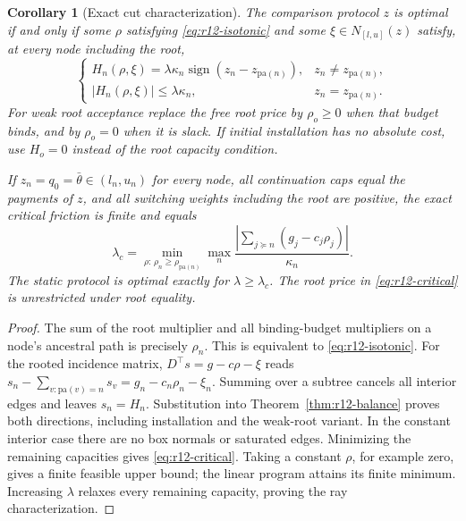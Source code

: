 \documentclass[11pt,letterpaper]{article}
\newtheorem{corollary}[theorem]{Corollary}
\theoremstyle{definition}
\newcommand{\1}{\mathbf 1}
\begin{document}
\begin{corollary}[Exact cut characterization]\label{cor:r12-cuts}
The comparison protocol $z$ is optimal if and only if some $\rho$ satisfying \eqref{eq:r12-isotonic} and some $\xi\in N_{[l,u]}(z)$ satisfy, at every node including the root,
\begin{equation}\label{eq:r12-cut-cap}
 \begin{cases}
 H_n(\rho,\xi)=\lambda\kappa_n\operatorname{sign}(z_n-z_{\mathrm{pa}(n)}),
      &z_n\ne z_{\mathrm{pa}(n)},\\
 |H_n(\rho,\xi)|\leq\lambda\kappa_n,
      &z_n=z_{\mathrm{pa}(n)}.
 \end{cases}
\end{equation}
For weak root acceptance replace the free root price by $\rho_o\geq0$ when that budget binds, and by $\rho_o=0$ when it is slack. If initial installation has no absolute cost, use $H_o=0$ instead of the root capacity condition.

If $z_n=q_0=\bar\theta\in(l_n,u_n)$ for every node, all continuation caps equal the payments of $z$, and all switching weights including the root are positive, the exact critical friction is finite and equals
\begin{equation}\label{eq:r12-critical}
 \lambda_c=\min_{\rho:\,\rho_n\geq\rho_{\mathrm{pa}(n)}}
            \max_n\frac{|\sum_{j\succeq n}(g_j-c_j\rho_j)|}{\kappa_n}.
\end{equation}
The static protocol is optimal exactly for $\lambda\geq\lambda_c$. The root price in \eqref{eq:r12-critical} is unrestricted under root equality.
\end{corollary}
\begin{proof}
The sum of the root multiplier and all binding-budget multipliers on a node's ancestral path is precisely $\rho_n$. This is equivalent to \eqref{eq:r12-isotonic}. For the rooted incidence matrix, $D^\top s=g-c\rho-\xi$ reads
$s_n-\sum_{v:\mathrm{pa}(v)=n}s_v=g_n-c_n\rho_n-\xi_n$.
Summing over a subtree cancels all interior edges and leaves $s_n=H_n$. Substitution into Theorem~\ref{thm:r12-balance} proves both directions, including installation and the weak-root variant. In the constant interior case there are no box normals or saturated edges. Minimizing the remaining capacities gives \eqref{eq:r12-critical}. Taking a constant $\rho$, for example zero, gives a finite feasible upper bound; the linear program attains its finite minimum. Increasing $\lambda$ relaxes every remaining capacity, proving the ray characterization.
\end{proof}
\end{document}
